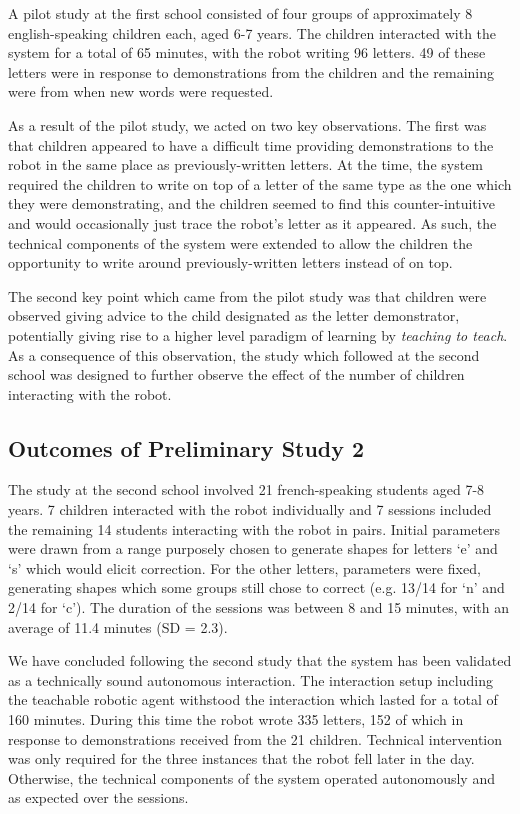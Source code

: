 \documentclass{sig-alternate}
\begin{document}
A pilot study at the first school consisted of four groups of approximately 8
english-speaking children each, aged 6-7 years. The children interacted with the
system for a total of 65 minutes, with the robot writing 96 letters. 49 of these
letters were in response to demonstrations from the children and the remaining
were from when new words were requested. 

As a result of the pilot study, we acted on two key observations. The first was
that children appeared to have a difficult time providing demonstrations to the
robot in the same place as previously-written letters. At the time, the system
required the children to write on top of a letter of the same type as the one
which they were demonstrating, and the children seemed to find this
counter-intuitive and would occasionally just trace the robot's letter as it
appeared. As such, the technical components of the system were extended to allow
the children the opportunity to write around previously-written letters instead
of on top. 

The second key point which came from the pilot study was that children were
observed giving advice to the child designated as the letter demonstrator,
potentially giving rise to a higher level paradigm of learning by \emph{teaching
to teach}. As a consequence of this observation, the study which followed at the
second school was designed to further observe the effect of the number of
children interacting with the robot.

\subsection{Outcomes of Preliminary Study 2}

The study at the second school involved 21 french-speaking students aged 7-8
years. 7 children interacted with the robot individually and 7 sessions included
the remaining 14 students interacting with the robot in pairs.  Initial
parameters were drawn from a range purposely chosen to generate shapes for
letters `e' and `s' which would elicit correction. For the other letters,
parameters were fixed, generating shapes which some groups still chose to
correct (e.g. 13/14 for `n' and 2/14 for `c'). The duration of the sessions was
between 8 and 15 minutes, with an average of 11.4 minutes (SD = 2.3). 


We have concluded following the second study that the system has been validated
as a technically sound autonomous interaction.  The interaction setup including
the teachable robotic agent withstood the interaction which lasted for a total
of 160 minutes.  During this time the robot wrote 335 letters, 152 of which in
response to demonstrations received from the 21 children. Technical intervention
was only required for the three instances that the robot fell later in the day.
Otherwise, the technical components of the system operated autonomously and as
expected over the sessions.
\end{document}
